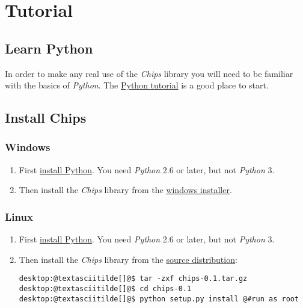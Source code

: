 \documentclass[letterpaper,10pt,english]{manual}
\begin{document}
\resetcurrentobjects
\hypertarget{--doc-tutorial/index}{}

\section{Tutorial}


\subsection{Learn Python}

In order to make any real use of the \emph{Chips} library you will need to be
familiar with the basics of \emph{Python}. The \href{http://docs.python.org/tut}{Python tutorial} is a good place
to start.


\subsection{Install Chips}


\subsubsection{Windows}
\begin{enumerate}
\item {} 
First \href{http://python.org/download}{install Python}. You need \emph{Python} 2.6 or later, but not \emph{Python} 3.

\item {} 
Then install the \emph{Chips} library from the \href{https://github.com/downloads/dawsonjon/chips/Chips-0.1.win32.exe}{windows installer}.

\end{enumerate}


\subsubsection{Linux}
\begin{enumerate}
\item {} 
First \href{http://python.org/download}{install Python}. You need \emph{Python} 2.6 or later, but not \emph{Python} 3.

\item {} 
Then install the \emph{Chips} library from the \href{https://github.com/downloads/dawsonjon/chips/Chips-0.1.tar.gz}{source distribution}:

\begin{Verbatim}[commandchars=@\[\]]
desktop:@textasciitilde[]@$ tar -zxf chips-0.1.tar.gz
desktop:@textasciitilde[]@$ cd chips-0.1
desktop:@textasciitilde[]@$ python setup.py install @#run as root
\end{Verbatim}

\end{enumerate}
\end{document}
